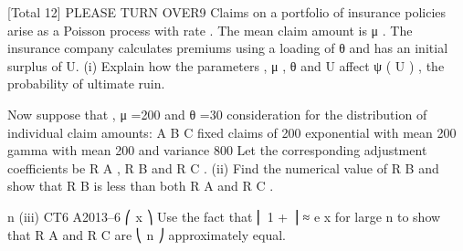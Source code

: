 
[Total 12]
PLEASE TURN OVER9
Claims on a portfolio of insurance policies arise as a Poisson process with rate \lambda .
The mean claim amount is μ . The insurance company calculates premiums using a
loading of θ and has an initial surplus of U.
(i)
Explain how the parameters \lambda , μ , θ and U affect ψ ( U ) , the probability of
ultimate ruin.

Now suppose that , μ =200 and θ =30%
consideration for the distribution of individual claim amounts:
A
B
C
fixed claims of 200
exponential with mean 200
gamma with mean 200 and variance 800
Let the corresponding adjustment coefficients be R A , R B and R C .
(ii)
Find the numerical value of R B and show that R B is less than both R A and
R C .

n
(iii)
CT6 A2013–6
⎛ x ⎞
Use the fact that ⎜ 1 + ⎟ ≈ e x for large n to show that R A and R C are
⎝ n ⎠
approximately equal.


